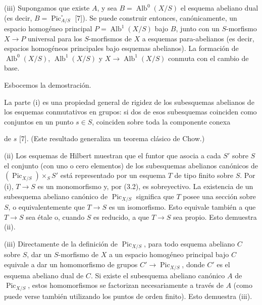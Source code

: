 \documentclass[11pt,twoside,openany]{book}
\numberwithin{equation}{section}
\newcommand{\src}[1]{%
  \phantomsection\hypertarget{src:#1}{}%
  \marginpar{\raggedleft\footnotesize\sffamily #1}%
}
\theoremstyle{plain}
\theoremstyle{definition}
\theoremstyle{remark}
\newcommand{\FgaUnitKey}{frontmatter}
\renewcommand{\src}[1]{%
  \phantomsection\hypertarget{src:\FgaUnitKey:#1}{}%
  \marginpar{\raggedleft\footnotesize\sffamily #1}%
}
\theoremstyle{plain}
\theoremstyle{definition}
\theoremstyle{remark}
\begin{document}
\noindent(iii) Supongamos que existe $A$, y sea
$B=\operatorname{Alb}^0(X/S)$ el esquema abeliano dual (es decir,
$B=\operatorname{Pic}_{A/S}^\circ$ [7]). Se puede construir entonces,
canónicamente, un espacio homogéneo principal
$P=\operatorname{Alb}^1(X/S)$ bajo $B$, junto con un $S$-morfismo
$X\longrightarrow P$ universal para los $S$-morfismos de $X$ a esquemas
para-abelianos (es decir, espacios homogéneos principales bajo esquemas
abelianos). La formación de $\operatorname{Alb}^0(X/S)$,
$\operatorname{Alb}^1(X/S)$ y
$X\longrightarrow\operatorname{Alb}^1(X/S)$ conmuta con el cambio de base.

Esbocemos la demostración.

La parte (i) es una propiedad general de rigidez de los subesquemas abelianos
de los esquemas conmutativos en grupos: si dos de esos subesquemas coinciden
como conjuntos en un punto $s\in S$, coinciden sobre toda la componente conexa

\src{238}
de $s$ [7]. (Este resultado generaliza un teorema clásico de Chow.)

(ii) Los esquemas de Hilbert muestran que el funtor que asocia a cada $S'$ sobre
$S$ el conjunto (con uno o cero elementos) de los subesquemas abelianos
canónicos de $(\operatorname{Pic}_{X/S})\times_S S'$ está representado por un
esquema $T$ de tipo finito sobre $S$. Por (i), $T\longrightarrow S$ es un
monomorfismo y, por (3.2), es sobreyectivo. La existencia de un subesquema
abeliano canónico de $\operatorname{Pic}_{X/S}$ significa que $T$ posee una
sección sobre $S$, o equivalentemente que $T\longrightarrow S$ es un
isomorfismo. Esto equivale también a que $T\longrightarrow S$ sea étale o,
cuando $S$ es reducido, a que $T\longrightarrow S$ sea propio. Esto demuestra
(ii).

(iii) Directamente de la definición de $\operatorname{Pic}_{X/S}$, para todo
esquema abeliano $C$ sobre $S$, dar un $S$-morfismo de $X$ a un espacio
homogéneo principal bajo $C$ equivale a dar un homomorfismo de grupos
$C'\longrightarrow\operatorname{Pic}_{X/S}$, donde $C'$ es el esquema abeliano
dual de $C$. Si existe el subesquema abeliano canónico $A$ de
$\operatorname{Pic}_{X/S}$, estos homomorfismos se factorizan necesariamente a
través de $A$ (como puede verse también utilizando los puntos de orden finito).
Esto demuestra (iii).
\end{document}

